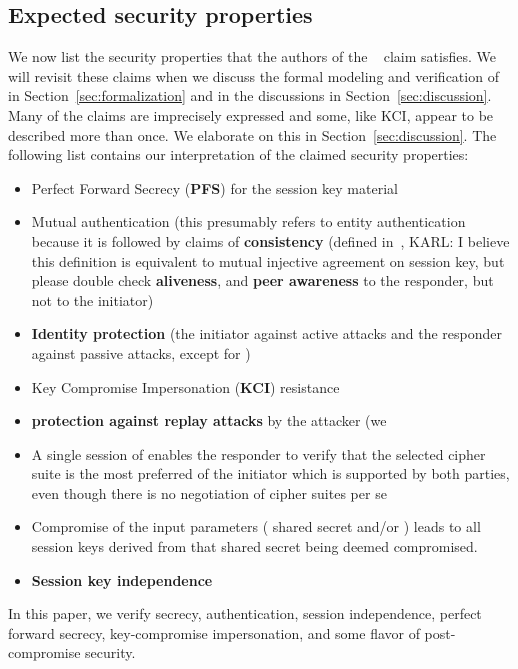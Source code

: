 \spacehack
\subsection{Expected security properties}
\label{sec:claimedProperties}
\fillhack
We now list the security properties that the authors
of the \mSpec{}~\cite{selander-lake-edhoc-01} claim \mEdhoc{} satisfies.
%
We will revisit these claims when we discuss the formal modeling and
verification of \mEdhoc{} in Section~\ref{sec:formalization} and in the
discussions in Section~\ref{sec:discussion}.
%
Many of the claims are imprecisely expressed and some, like KCI, appear to be
described more than once.
%
We elaborate on this in Section~\ref{sec:discussion}.
%
The following list contains our interpretation of the claimed security
properties:
\begin{itemize}
    \item Perfect Forward Secrecy (\textbf{PFS}) for the session key material
    \item Mutual authentication (this presumably refers to entity authentication
        because it is followed by claims of
        \textbf{consistency} (defined in~\cite{sigma}, {\color{red} KARL: I
            believe this definition is equivalent to mutual injective agreement
            on session key, but please double check}
        \textbf{aliveness}, and
        \textbf{peer awareness} to the responder, but not to the initiator)
    \item \textbf{Identity protection} (the initiator against active attacks
        and the responder against passive attacks, except for \mPskPsk{})
    \item Key Compromise Impersonation (\textbf{KCI}) resistance
    \item \textbf{protection against replay attacks} by the attacker (we
    \item A single session of \mEdhoc{} enables the responder to verify
            that the selected cipher suite is the most preferred of the
            initiator which is supported by both parties, even though there is
            no negotiation of cipher suites per se
    \item Compromise of the \mHkdf{} input parameters (\mGxy{} shared
            secret and/or \mPsk) leads to all session keys derived from that
            shared secret being deemed compromised.
        \item \textbf{Session key independence}
\end{itemize}
%
In this paper, we verify {\color{red} secrecy, authentication, session independence,
perfect forward secrecy, key-compromise impersonation, and some
flavor of post-compromise security.}
%
